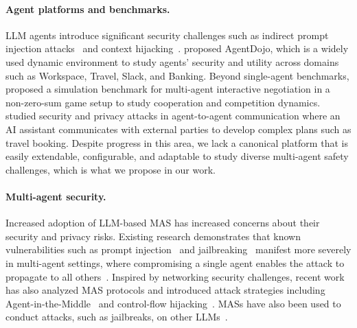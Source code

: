 \paragraph{Agent platforms and benchmarks.} LLM agents introduce significant security challenges such as indirect prompt injection attacks~\citep{greshake2023not} and context hijacking~\citep{bagdasarian2024airgapagent}. \citet{debenedetti2024agentdojo} proposed AgentDojo, which is a widely used dynamic environment to study agents' security and utility across domains such as Workspace, Travel, Slack, and Banking. Beyond single-agent benchmarks, \citet{abdelnabi2024cooperation} proposed a simulation benchmark for multi-agent interactive negotiation in a non-zero-sum game setup to study cooperation and competition dynamics. \citet{abdelnabi2025firewalls} studied security and privacy attacks in agent-to-agent communication where an AI assistant communicates with external parties to develop complex plans such as travel booking. Despite progress in this area, we lack a canonical platform that is easily extendable, configurable, and adaptable to study diverse multi-agent safety challenges, which is what we propose in our work. 

\paragraph{Multi-agent security.}
Increased adoption of LLM-based MAS has increased concerns about their security and privacy risks. Existing research demonstrates that known vulnerabilities such as prompt injection~\citep{greshake2023not} and jailbreaking~\citep{anil2024many} manifest more severely in multi-agent settings, where compromising a single agent enables the attack to propagate to all others~\citep{lee2024prompt}. Inspired by networking security challenges, recent work has also analyzed MAS protocols and introduced attack strategies including Agent-in-the-Middle~\citep{he2025red} and control-flow hijacking~\citep{triedman2025multi}. MASs have also been used to conduct attacks, such as jailbreaks, on other LLMs~\citep{rahman2025x,abdelnabi2025firewalls}.


